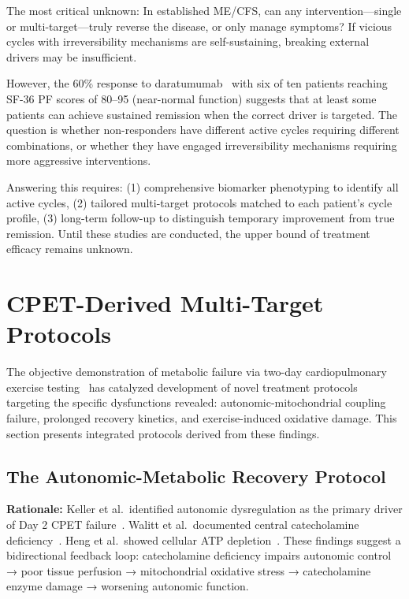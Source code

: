 \begin{open_question}
The most critical unknown: In established ME/CFS, can any intervention---single or multi-target---truly reverse the disease, or only manage symptoms? If vicious cycles with irreversibility mechanisms are self-sustaining, breaking external drivers may be insufficient.

However, the 60\% response to daratumumab~\cite{Fluge2025daratumumab} with six of ten patients reaching SF-36 PF scores of 80--95 (near-normal function) suggests that at least some patients can achieve sustained remission when the correct driver is targeted. The question is whether non-responders have different active cycles requiring different combinations, or whether they have engaged irreversibility mechanisms requiring more aggressive interventions.

Answering this requires: (1) comprehensive biomarker phenotyping to identify all active cycles, (2) tailored multi-target protocols matched to each patient's cycle profile, (3) long-term follow-up to distinguish temporary improvement from true remission. Until these studies are conducted, the upper bound of treatment efficacy remains unknown.
\end{open_question}

\section{CPET-Derived Multi-Target Protocols}
\label{sec:cpet-protocols}

The objective demonstration of metabolic failure via two-day cardiopulmonary exercise testing~\cite{keller2024cpet} has catalyzed development of novel treatment protocols targeting the specific dysfunctions revealed: autonomic-mitochondrial coupling failure, prolonged recovery kinetics, and exercise-induced oxidative damage. This section presents integrated protocols derived from these findings.

\subsection{The Autonomic-Metabolic Recovery Protocol}
\label{subsec:autonomic-metabolic-protocol}

\textbf{Rationale:} Keller et al.\ identified autonomic dysregulation as the primary driver of Day 2 CPET failure~\cite{keller2024cpet}. Walitt et al.\ documented central catecholamine deficiency~\cite{walitt2024deep}. Heng et al.\ showed cellular ATP depletion~\cite{heng2025mecfs}. These findings suggest a bidirectional feedback loop: catecholamine deficiency impairs autonomic control → poor tissue perfusion → mitochondrial oxidative stress → catecholamine enzyme damage → worsening autonomic function.


